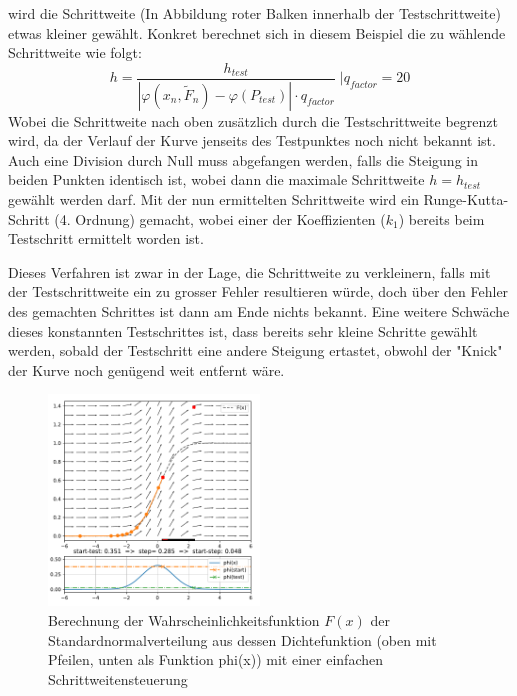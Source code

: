 wird die Schrittweite (In Abbildung roter Balken innerhalb der Testschrittweite) etwas kleiner gewählt.
Konkret berechnet sich in diesem Beispiel die zu wählende Schrittweite wie folgt:
\[
  h=\frac{h_{test}}{|\varphi(x_n, \tilde{F}_n)-\varphi(P_{test})|\cdot q_{factor}}\; |q_{factor}=20
\]
Wobei die Schrittweite nach oben zusätzlich durch die Testschrittweite begrenzt wird,
da der Verlauf der Kurve jenseits des Testpunktes noch nicht bekannt ist.
Auch eine Division durch Null muss abgefangen werden, falls die Steigung in beiden Punkten identisch ist,
wobei dann die maximale Schrittweite $h=h_{test}$ gewählt werden darf.
Mit der nun ermittelten Schrittweite wird ein Runge-Kutta-Schritt (4. Ordnung) gemacht,
wobei einer der Koeffizienten ($k_1$) bereits beim Testschritt ermittelt worden ist.

Dieses Verfahren ist zwar in der Lage, die Schrittweite zu verkleinern, falls mit der Testschrittweite ein zu grosser Fehler resultieren würde,
doch über den Fehler des gemachten Schrittes ist dann am Ende nichts bekannt.
Eine weitere Schwäche dieses konstannten Testschrittes ist, dass bereits sehr kleine Schritte gewählt werden,
sobald der Testschritt eine andere Steigung ertastet, obwohl der "Knick" der Kurve noch genügend weit entfernt wäre.

\begin{figure}
  \centering
  \includegraphics[width=0.5\textwidth]{papers/steps/img/ssc.pdf}
  \caption{Berechnung der Wahrscheinlichkeitsfunktion $F(x)$ der Standardnormalverteilung aus dessen Dichtefunktion
    (oben mit Pfeilen, unten als Funktion phi(x)) mit einer einfachen Schrittweitensteuerung
    \label{buch:steps:examplessc}}
\end{figure}

